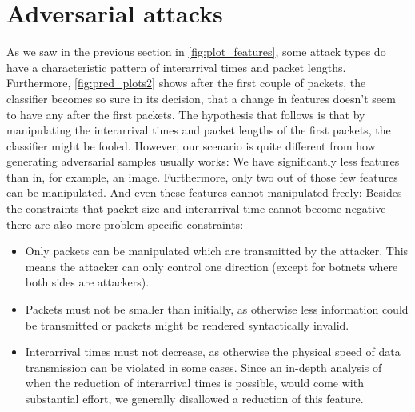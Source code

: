 \documentclass[conference]{IEEEtran}
\begin{document}
%
%

\section{Adversarial attacks}
\label{sec:adv}

As we saw in the previous section in \autoref{fig:plot_features}, some attack types do have a characteristic pattern of interarrival times and packet lengths. Furthermore, \autoref{fig:pred_plots2} shows after the first couple of packets, the classifier becomes so sure in its decision, that a change in features doesn't seem to have any after the first packets. The hypothesis that follows is that by manipulating the interarrival times and packet lengths of the first packets, the classifier might be fooled. However, our scenario is quite different from how generating adversarial samples usually works: We have significantly less features than in, for example, an image. Furthermore, only two out of those few features can be manipulated. And even these features cannot manipulated freely: Besides the constraints that packet size and interarrival time cannot become negative there are also more problem-specific constraints:
\begin{itemize}
\item Only packets can be manipulated which are transmitted by the attacker. This means the attacker can only control one direction (except for botnets where both sides are attackers).
\item Packets must not be smaller than initially, as otherwise less information could be transmitted or packets might be rendered syntactically invalid.
\item Interarrival times must not decrease, as otherwise the physical speed of data transmission can be violated in some cases. Since an in-depth analysis of when the reduction of interarrival times is possible, would come with substantial effort, we generally disallowed a reduction of this feature.
\end{itemize}
\end{document}
